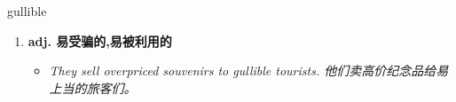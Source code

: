 
\begin{frame}
{\huge gullible}
\begin{center}
\begin{enumerate}\Large
  \item \textbf{adj. 易受骗的,易被利用的}
  \begin{itemize}
    \item \em{\Large{They sell overpriced souvenirs to gullible tourists. 他们卖高价纪念品给易上当的旅客们。}}
  \end{itemize}
\end{enumerate}
\end{center}
\end{frame}
